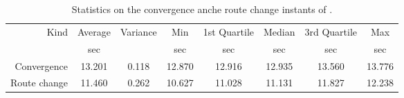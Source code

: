        \begin{table}[htbp]
            \centering
            \begin{tabular}{rccccccc}
            \toprule
            Kind & Average & Variance & Min & 1st Quartile &
            Median & 3rd Quartile & Max \\
            & \footnotesize{sec} & & \footnotesize{sec} & \footnotesize{sec} &
            \footnotesize{sec} & \footnotesize{sec} & \footnotesize{sec} \\
            \midrule
            Convergence & 13.201 & 0.118 & 12.870 & 12.916 & 12.935 & 13.560 &13.776 \\
            Route change & 11.460 & 0.262 & 10.627 & 11.028 & 11.131 &11.827 & 12.238 \\
            \bottomrule
            \end{tabular}
           \caption{Statistics on the convergence anche route change
              instants of \olsr.}
            \label{tab:convergence_olsr}
        \end{table}
